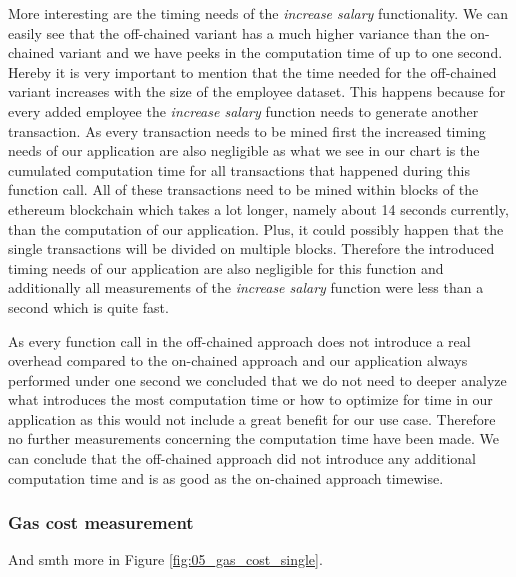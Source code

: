 More interesting are the timing needs of the \textit{increase salary} functionality. We can easily see that the off-chained variant has a much higher variance than the on-chained variant and we have peeks in the computation time of up to one second. Hereby it is very important to mention that the time needed for the off-chained variant increases with the size of the employee dataset. This happens because for every added employee the \textit{increase salary} function needs to generate another transaction. As every transaction needs to be mined first the increased timing needs of our application are also negligible as what we see in our chart is the cumulated computation time for all transactions that happened during this function call. All of these transactions need to be mined within blocks of the ethereum blockchain which takes a lot longer, namely about 14 seconds currently, than the computation of our application. Plus, it could possibly happen that the single transactions will be divided on multiple blocks. Therefore the introduced timing needs of our application are also negligible for this function and additionally all measurements of the \textit{increase salary} function were less than a second which is quite fast.%

As every function call in the off-chained approach does not introduce a real overhead compared to the on-chained approach and our application always performed under one second we concluded that we do not need to deeper analyze what introduces the most computation time or how to optimize for time in our application as this would not include a great benefit for our use case. Therefore no further measurements concerning the computation time have been made. We can conclude that the off-chained approach did not introduce any additional computation time and is as good as the on-chained approach timewise.

\subsubsection{Gas cost measurement}

And smth more in Figure \ref{fig:05_gas_cost_single}.

